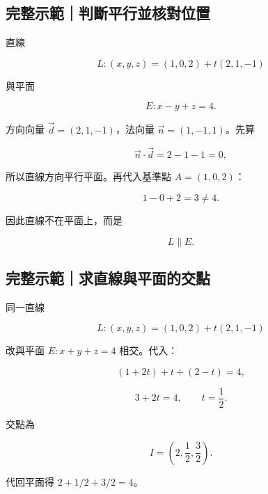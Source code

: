 \documentclass[11pt,a4paper]{article}
\begin{document}
\begin{HandoutWorkedExample}

\subsection{完整示範｜判斷平行並核對位置}\label{ux5b8cux6574ux793aux7bc4ux5224ux65b7ux5e73ux884cux4e26ux6838ux5c0dux4f4dux7f6e}

直線

\[
L:(x,y,z)=(1,0,2)+t(2,1,-1)
\]

與平面

\[
E:x-y+z=4.
\]

方向向量 \(\vec d=(2,1,-1)\)，法向量 \(\vec n=(1,-1,1)\)。先算

\[
\vec n\cdot\vec d=2-1-1=0,
\]

所以直線方向平行平面。再代入基準點 \(A=(1,0,2)\)：

\[
1-0+2=3\ne4.
\]

因此直線不在平面上，而是

\[
\boxed{L\parallel E}.
\]

\end{HandoutWorkedExample}

\begin{HandoutWorkedExample}

\subsection{完整示範｜求直線與平面的交點}\label{ux5b8cux6574ux793aux7bc4ux6c42ux76f4ux7ddaux8207ux5e73ux9762ux7684ux4ea4ux9ede}

同一直線

\[
L:(x,y,z)=(1,0,2)+t(2,1,-1)
\]

改與平面 \(E:x+y+z=4\) 相交。代入：

\[
(1+2t)+t+(2-t)=4,
\]

\[
3+2t=4,
\qquad t=\frac12.
\]

交點為

\[
\boxed{
I=\left(2,\frac12,\frac32\right)
}.
\]

代回平面得 \(2+1/2+3/2=4\)。

\end{HandoutWorkedExample}
\end{document}
